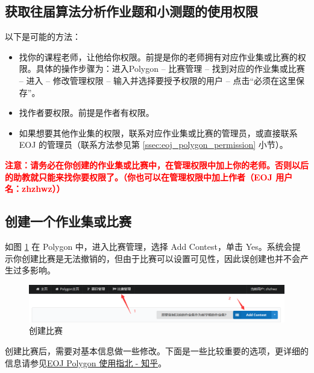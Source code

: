 \documentclass[oneside]{book}
\begin{document}
\label{sec:polygon_operating_procedures}

\subsection{获取往届算法分析作业题和小测题的使用权限}

\label{ssec:permission_get}

以下是可能的方法：

\begin{itemize}
    \item 找你的课程老师，让他给你权限。前提是你的老师拥有对应作业集或比赛的权限。具体的操作步骤为：进入Polygon -- 比赛管理 -- 找到对应的作业集或比赛 -- 进入 -- 修改管理权限 -- 输入并选择要授予权限的用户 -- 点击``必须在这里保存''。
    \item 找作者要权限。前提是作者有权限。
    \item 如果想要其他作业集的权限，联系对应作业集或比赛的管理员，或直接联系 EOJ 的管理员（联系方法参见第 \ref{ssec:eoj_polygon_permission} 小节）。
\end{itemize}

\textbf{\textcolor{red}{注意：请务必在你创建的作业集或比赛中，在管理权限中加上你的老师。否则以后的助教就只能来找你要权限了。（你也可以在管理权限中加上作者（EOJ 用户名：zhzhwz））}}

\subsection{创建一个作业集或比赛}

\label{ssec:create_homework_set}

如图 \ref{fig:create_contest} 在 Polygon 中，进入比赛管理，选择 Add Contest，单击 Yes。系统会提示你创建比赛是无法撤销的，但由于比赛可以设置可见性，因此误创建也并不会产生过多影响。

\begin{figure}[htbp]
  \centering
  \includegraphics[width=\textwidth]{res/create_contest.png}
  \caption{创建比赛}
  \label{fig:create_contest}
\end{figure}

创建比赛后，需要对基本信息做一些修改。下面是一些比较重要的选项，更详细的信息请参见\href{https://zhuanlan.zhihu.com/p/59869879}{EOJ Polygon 使用指北 - 知乎}。
\end{document}
